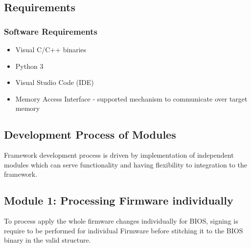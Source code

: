\subsection{Requirements}\label{subsection-requirements}
\subsubsection{Software Requirements}
\begin{itemize}
	\item Visual C/C++ binaries
	\item Python 3
	\item Visual Studio Code (IDE)
	\item Memory Access Interface - supported mechanism to communicate over target memory
\end{itemize}

\subsection{Development Process of Modules}
Framework development process is driven by implementation of independent modules which can serve functionality and having flexibility to integration to the framework.


\subsection{Module 1: Processing Firmware individually}\label{subsection-processing-firmware}
To process apply the whole firmware changes individually for BIOS, signing is require to be performed for individual Firmware before stitching it to the BIOS binary in the valid structure.

